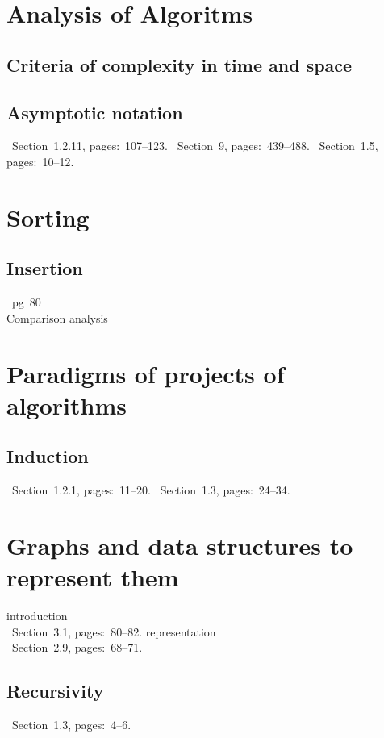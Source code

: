\documentclass{article}
\def\range#1#2#3{Section~#1, pages:~#2--#3.\newline}
\begin{document}
\section{Analysis of Algoritms}

\subsection{Criteria of complexity in time and space}

\subsection{Asymptotic notation}
\cite{taocp1}~\range{1.2.11}{107}{123}
\cite{graham}~\range{9}{439}{488}
\cite{szwarcfiter}~\range{1.5}{10}{12}

\section{Sorting}

\subsection{Insertion}

\cite{taocp3}~pg~80\\
Comparison analysis~\cite{taocp1}

\section{Paradigms of projects of algorithms}

\subsection{Induction}
\cite{taocp1}~\range{1.2.1}{11}{20}
\cite{milies}~\range{1.3}{24}{34}

\section{Graphs and data structures to represent them}
\noindent introduction \\
\cite{dasgupta}~\range{3.1}{80}{82}
\noindent representation\\
\cite{szwarcfiter}~\range{2.9}{68}{71}


\subsection{Recursivity}
\cite{szwarcfiter}~\range{1.3}{4}{6}
\end{document}
